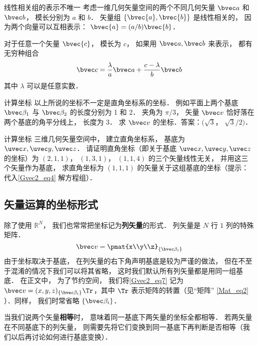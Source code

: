 \begin{example}{线性相关组的表示不唯一}
考虑一维几何矢量空间的两个不同几何矢量 $\bvec a$ 和 $\bvec b$， 模长分别为 $a$ 和 $b$． 矢量组 $\{\bvec{a}, \bvec{b}\}$ 是线性相关的， 因为两个向量可以互相表示： $\bvec{a}=(a/b)\bvec{b}$．

对于任意一个矢量 $\bvec{c}$， 模长为 $c$， 如果用 $\bvec a, \bvec b$ 来表示， 都有无穷种组合
\begin{equation}
\bvec c = \frac{\lambda}{a} \bvec a + \frac{c - \lambda}{b} \bvec b
\end{equation}
其中 $\lambda$ 可以是任意实数．
\end{example}

\begin{exercise}{计算坐标}
以上所说的坐标不一定是直角坐标系的坐标． 例如平面上两个基底 $\bvec \beta_1$ 与 $\bvec \beta_2$ 的长度分别为 1 和 2． 夹角为 $\pi/3$， 矢量 $\bvec v$ 恰好落在两个基底的角平分线上， 长度为 3． 求 $\bvec v$ 的坐标．答案：$(\sqrt 3$， $\sqrt 3/2)$．
\end{exercise}

\begin{exercise}{计算坐标}
三维几何矢量空间中， 建立直角坐标系， 基底为 $\uvec x, \uvec y, \uvec z$． 请证明直角坐标（即关于基底 $\uvec x, \uvec y, \uvec z$ 的坐标）为 $(2, 1, 1)$， $(1, 3, 1)$， $(1, 1, 4)$ 的三个矢量线性无关， 并用这三个矢量作为基底， 求直角坐标为 $(1, 1, 1)$ 的矢量关于这组基底的坐标（提示：代入\autoref{Gvec2_eq4} 解方程组）．
\end{exercise}

\subsection{矢量运算的坐标形式}
除了使用 $\mathbb R^N$， 我们也常常把坐标记为\textbf{列矢量}的形式． 列矢量是 $N$ 行 $1$ 列的特殊矩阵．
\begin{equation}\label{Gvec2_eq7}
\bvec v = \pmat{x\\y\\z}_{\{\bvec\beta_i\}}
\end{equation}
由于坐标取决于基底， 在列矢量的右下角声明基底是较为严谨的做法， 但在不至于混淆的情况下我们可以将其省略， 这时我们默认所有列矢量都是用同一组基底． 在正文中， 为了节约空间， 我们将\autoref{Gvec2_eq7} 记为 $\bvec v = (x, y, z)_{\{\bvec\beta_i\}}\Tr$，其中 $\Tr$ 表示矩阵的转置（见“矩阵” \autoref{Mat_eq2} ）．同样， 我们时常省略 $\{\bvec\beta_i\}$．

当我们说两个矢量\textbf{相等}时， 意味着同一基底下两矢量的坐标全都相等． 若两矢量在不同基底下的列矢量， 则需要先将它们变换到同一基底下再判断是否相等（我们以后再讨论如何进行基底变换）．

